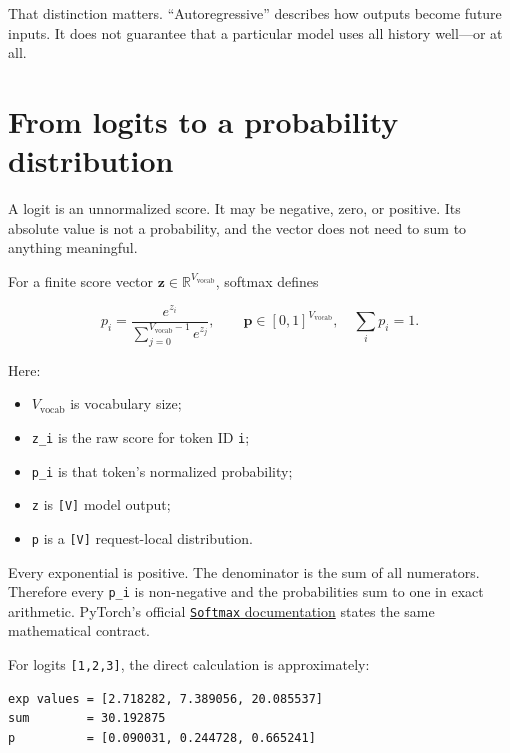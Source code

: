That distinction matters. ``Autoregressive'' describes how outputs
become future inputs. It does not guarantee that a particular model uses
all history well---or at all.

\section{From logits to a probability
distribution}\label{from-logits-to-a-probability-distribution}

A logit is an unnormalized score. It may be negative, zero, or positive.
Its absolute value is not a probability, and the vector does not need to
sum to anything meaningful.

For a finite score vector
\(\mathbf{z}\in\mathbb{R}^{V_{\mathrm{vocab}}}\), softmax defines

\begin{equation}
p_i=\frac{e^{z_i}}
{\sum_{j=0}^{V_{\mathrm{vocab}}-1}e^{z_j}},
\qquad
\mathbf{p}\in[0,1]^{V_{\mathrm{vocab}}},
\quad \sum_i p_i=1.
\end{equation}

Here:

\begin{itemize}
\tightlist
\item
  \(V_{\mathrm{vocab}}\) is vocabulary size;
\item
  \texttt{z\_i} is the raw score for token ID \texttt{i};
\item
  \texttt{p\_i} is that token's normalized probability;
\item
  \texttt{z} is \texttt{{[}V{]}} model output;
\item
  \texttt{p} is a \texttt{{[}V{]}} request-local distribution.
\end{itemize}

Every exponential is positive. The denominator is the sum of all
numerators. Therefore every \texttt{p\_i} is non-negative and the
probabilities sum to one in exact arithmetic. PyTorch's official
\href{https://docs.pytorch.org/docs/stable/generated/torch.nn.Softmax.html}{\texttt{Softmax}
documentation} states the same mathematical contract.

For logits \texttt{{[}1,2,3{]}}, the direct calculation is
approximately:

\begin{verbatim}
exp values = [2.718282, 7.389056, 20.085537]
sum        = 30.192875
p          = [0.090031, 0.244728, 0.665241]
\end{verbatim}

